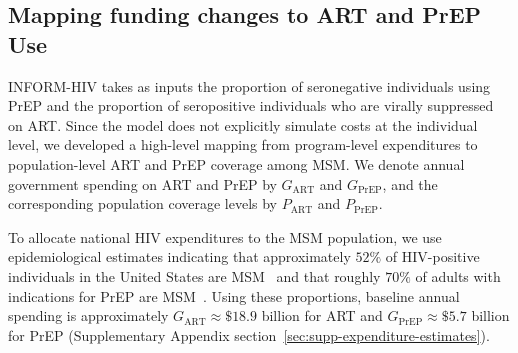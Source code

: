 \documentclass[preprint,12pt]{elsarticle}
\newcommand{\suppref}[1]{\ref*{#1}}%
\newcommand{\suppref}[1]{\ref{#1}}%
\begin{document}
\subsection{Mapping funding changes to ART and PrEP Use}
\label{sec:methods-mapping-funding}

INFORM-HIV takes as inputs the proportion of seronegative individuals using PrEP and the proportion of seropositive individuals who are virally suppressed on ART. Since the model does not explicitly simulate costs at the individual level, we developed a high-level mapping from program-level expenditures to population-level ART and PrEP coverage among MSM. We denote annual government spending on ART and PrEP by $G_{\text{ART}}$ and $G_{\text{PrEP}}$, and the corresponding population coverage levels by $P_{\text{ART}}$ and $P_{\text{PrEP}}$.

To allocate national HIV expenditures to the MSM population, we use epidemiological estimates indicating that approximately $52\%$ of HIV-positive individuals in the United States are MSM~\cite{Fed_HIV_stats} and that roughly $70\%$ of adults with indications for PrEP are MSM~\cite{prepcosts2018}. Using these proportions, baseline annual spending is approximately $G_{\text{ART}} \approx \$18.9$ billion for ART and $G_{\text{PrEP}} \approx \$5.7$ billion for PrEP (Supplementary Appendix section~\suppref{sec:supp-expenditure-estimates}).


\end{document}
